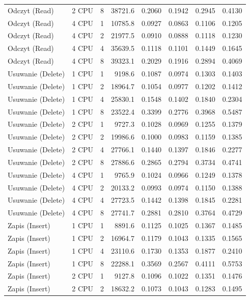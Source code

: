 \begin{table}[ht]
{\begin{tabular}{llcrrrrr}
Odczyt (Read) & 2 CPU & 8 & 38721.6 & 0.2060 & 0.1942 & 0.2945 & 0.4130 \\
Odczyt (Read) & 4 CPU & 1 & 10785.8 & 0.0927 & 0.0863 & 0.1106 & 0.1205 \\
Odczyt (Read) & 4 CPU & 2 & 21977.5 & 0.0910 & 0.0888 & 0.1118 & 0.1230 \\
Odczyt (Read) & 4 CPU & 4 & 35639.5 & 0.1118 & 0.1101 & 0.1449 & 0.1645 \\
Odczyt (Read) & 4 CPU & 8 & 39323.1 & 0.2029 & 0.1916 & 0.2894 & 0.4069 \\
Usuwanie (Delete) & 1 CPU & 1 & 9198.6 & 0.1087 & 0.0974 & 0.1303 & 0.1403 \\
Usuwanie (Delete) & 1 CPU & 2 & 18964.7 & 0.1054 & 0.0977 & 0.1202 & 0.1412 \\
Usuwanie (Delete) & 1 CPU & 4 & 25830.1 & 0.1548 & 0.1402 & 0.1840 & 0.2304 \\
Usuwanie (Delete) & 1 CPU & 8 & 23522.4 & 0.3399 & 0.2776 & 0.3968 & 0.5487 \\
Usuwanie (Delete) & 2 CPU & 1 & 9727.3 & 0.1028 & 0.0969 & 0.1255 & 0.1379 \\
Usuwanie (Delete) & 2 CPU & 2 & 19986.6 & 0.1000 & 0.0983 & 0.1159 & 0.1385 \\
Usuwanie (Delete) & 2 CPU & 4 & 27766.1 & 0.1440 & 0.1397 & 0.1846 & 0.2277 \\
Usuwanie (Delete) & 2 CPU & 8 & 27886.6 & 0.2865 & 0.2794 & 0.3734 & 0.4741 \\
Usuwanie (Delete) & 4 CPU & 1 & 9765.9 & 0.1024 & 0.0966 & 0.1249 & 0.1378 \\
Usuwanie (Delete) & 4 CPU & 2 & 20133.2 & 0.0993 & 0.0974 & 0.1150 & 0.1388 \\
Usuwanie (Delete) & 4 CPU & 4 & 27723.5 & 0.1442 & 0.1398 & 0.1845 & 0.2281 \\
Usuwanie (Delete) & 4 CPU & 8 & 27741.7 & 0.2881 & 0.2810 & 0.3764 & 0.4729 \\
Zapis (Insert) & 1 CPU & 1 & 8891.6 & 0.1125 & 0.1025 & 0.1367 & 0.1485 \\
Zapis (Insert) & 1 CPU & 2 & 16964.7 & 0.1179 & 0.1043 & 0.1335 & 0.1565 \\
Zapis (Insert) & 1 CPU & 4 & 23110.6 & 0.1730 & 0.1353 & 0.1877 & 0.2410 \\
Zapis (Insert) & 1 CPU & 8 & 22288.1 & 0.3569 & 0.2567 & 0.4111 & 0.5753 \\
Zapis (Insert) & 2 CPU & 1 & 9127.8 & 0.1096 & 0.1022 & 0.1351 & 0.1476 \\
Zapis (Insert) & 2 CPU & 2 & 18632.2 & 0.1073 & 0.1043 & 0.1283 & 0.1495 \\

\end{tabular}}
\end{table}
